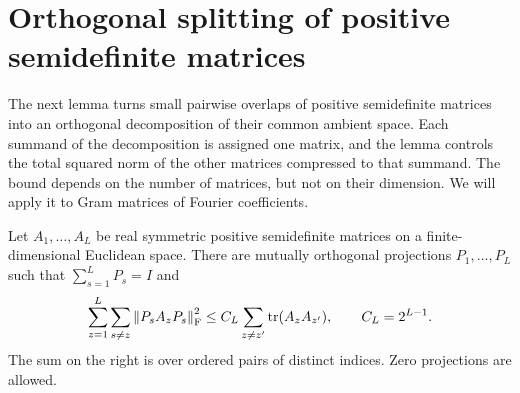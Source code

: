 \section{Orthogonal splitting of positive semidefinite matrices}
\label{sec:splitting}

The next lemma turns small pairwise overlaps of positive semidefinite
matrices into an orthogonal decomposition of their common ambient space.
Each summand of the decomposition is assigned one matrix, and the lemma
controls the total squared norm of the other matrices compressed to that
summand.  The bound depends on the number of matrices, but not on their
dimension.  We will apply it to Gram matrices of Fourier coefficients.

\begin{lemma}\label{lem:splitting}
Let $A_1,\ldots,A_L$ be real symmetric positive semidefinite matrices
on a finite-dimensional Euclidean space.  There are mutually orthogonal
projections $P_1,\ldots,P_L$ such that $\sum_{s=1}^L P_s=I$ and
\begin{equation}\label{eq:orthogonal-splitting}
  \sum_{z=1}^L\sum_{s\ne z}\left\lVert P_sA_zP_s\right\rVert_{\mathrm F}^{2}
  \le C_L\sum_{z\ne z'}\operatorname{tr}(A_zA_{z'}),
  \qquad C_L=2^{L-1}.
\end{equation}
The sum on the right is over ordered pairs of distinct indices.
Zero projections are allowed.
\end{lemma}

